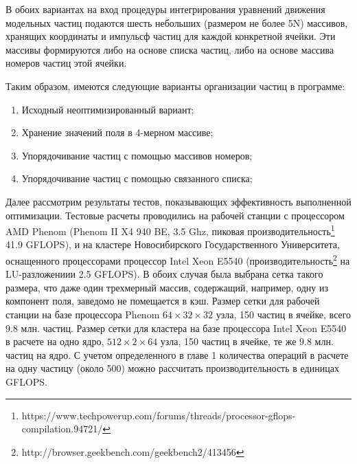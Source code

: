 В обоих вариантах на вход процедуры интегрирования уравнений движения модельных частиц подаются шесть небольших (размером не более 5N) массивов, хранящих координаты и импульсф частиц для каждой конкретной ячейки. Эти массивы формируются либо на основе списка частиц, либо на основе массива номеров частиц этой ячейки. 

Таким образом, имеются следующие варианты организации частиц в программе:
\begin{enumerate}
	\item Исходный неоптимизированный вариант; 
	\item Хранение значений поля в 4-мерном массиве; 
	\item Упорядочивание частиц с помощью массивов номеров; 
	\item Упорядочивание частиц с помощью связанного списка; 
\end{enumerate}

Далее рассмотрим результаты тестов, показывающих эффективность выполненной оптимизации. Тестовые расчеты проводились на рабочей станции с процессором AMD Phenom (Phenom II X4 940 BE, 3.5 Ghz, пиковая производительность\footnote{https://www.techpowerup.com/forums/threads/processor-gflops-compilation.94721/} 41.9 GFLOPS), и на кластере Новосибирского Государственного Университета, оснащенного процессорами процессор Intel Xeon  E5540 (производительность\footnote{http://browser.geekbench.com/geekbench2/413456} на LU-разложениии 2.5 GFLOPS). В обоих случая была выбрана сетка такого размера, что даже один трехмерный массив, содержащий, например, одну из компонент поля, заведомо не помещается в кэш. 
Размер сетки для рабочей станции на базе процессора Phenom  $64\times32\times32$ узла, 150 частиц в ячейке, всего 9.8 млн. частиц. Размер сетки для кластера на базе процессора Intel Xeon  E5540 в расчете на одно ядро, $512\times2\times64$ узла, 150 частиц в ячейке, те же 9.8 млн. частиц на ядро. С учетом определенного в главе 1 количества операций в расчете на одну частицу (около 500) можно рассчитать производительность в единицах GFLOPS.

